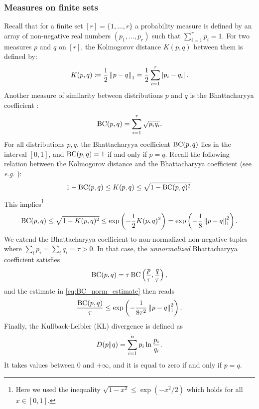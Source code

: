 \documentclass[notitlepage, 11pt, letterpaper]{amsart}
\begin{document}
\subsubsection{Measures on finite sets}

Recall that for a finite set $[r]=\{ 1, \ldots, r\}$ a probability measure is defined by an array of non-negative real numbers $(p_1, \ldots, p_r)$ such that $\sum_{i=1}^r p_i =1$.
For two measures $p$ and $q$ on $[r]$, the Kolmogorov distance $K(p,q)$ between them is defined by:
\begin{equation}
    K(p,q) \coloneqq \frac{1}{2}\left\lVert p-q\right\rVert_1
    = \frac{1}{2} \sum_{i=1}^r \left|p_i - q_i\right|.
\end{equation}
Another measure of similarity between distributions $p$ and $q$ is the Bhattacharyya coefficient \cite{bhattacharyya1946measure,fuchs2002cryptographic}:
\begin{equation}
    \label{eq:Bhattacharyya_coefficient}
    \operatorname{BC}(p,q) = \sum_{i=1}^r \sqrt{p_iq_i}.
\end{equation}
For all distributions $p, q$, the Bhattacharyya coefficient $\operatorname{BC}(p,q)$ lies in the interval $[0,1]$, and $\operatorname{BC}(p,q)=1$ if and only if $p=q$.
Recall the following relation between
the Kolmogorov distance and the Bhattacharyya coefficient (see {\em e.g.} \cite[Proposition 5, Equation (41)]{fuchs2002cryptographic}):
\begin{equation}
    1-\operatorname{BC}(p,q) \leq K(p,q) \leq \sqrt{1-\operatorname{BC}(p,q)^2}.
\end{equation}
This implies\footnote{Here we used the inequality $\sqrt{1-x^2} \leq \exp(-x^2/2)$ which holds for all $x \in [0,1]$.}
\begin{equation}
    \label{eq:BC_norm_estimate}
    \operatorname{BC}(p,q) \leq \sqrt{1-K(p,q)^2} \leq \exp\left(- \frac{1}{2} K(p,q)^2\right)=
    \exp\left(- \frac{1}{8} \left\lVert p-q\right\rVert_1^2\right).
\end{equation}
We extend the Bhattacharyya coefficient to non-normalized non-negative tuples where $\sum_i p_i = \sum_i q_i = \tau >0$.
In that case, the \textit{unnormalized} Bhattacharyya coefficient satisfies
\begin{equation}
    \operatorname{BC}(p,q) = \tau  \operatorname{BC}\left(\frac{p}{\tau}, \frac{q}{\tau}\right),
\end{equation}
and the estimate in \cref{eq:BC_norm_estimate} then reads
\begin{equation}
    \label{eq:bhattacharyya_vs_distance}
    \frac{\operatorname{BC}(p,q)}{\tau} \leq \exp\left(-\frac{1}{8\tau^2}\left\lVert p-q\right\rVert_1^2\right).
\end{equation}
Finally, the Kullback-Leibler (KL) divergence is defined as
\begin{equation}
    \label{eq:KL_divergence}
    D\!\left(p\middle\|q\right) = \sum_{i=1}^{n} p_i \ln \frac{p_i}{q_i}.
\end{equation}
It takes values between $0$ and $+\infty$, and it is equal to zero if and only if $p=q$.
\end{document}
